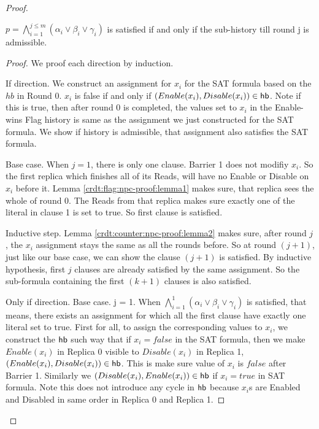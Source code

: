 \begin{proof}
  
  \begin{lemma}
    \label{crdt:flag:npc-proof:lemma3}
    $p = \bigwedge_{i=1}^{j \leq m} (\alpha_i \lor \beta_i \lor \gamma_i)$ is satisfied if and only if the sub-history till round j is admissible.
  \end{lemma}

  \begin{proof}
    We proof each direction by induction.

    If direction.
    We construct an assignment for $x_i$ for the SAT formula based on the $hb$ in Round 0. $x_i$ is false if and only if $(Enable(x_i), Disable(x_i)) \in \textsf{hb}$. Note if this is true, then after round 0 is completed, the values set to $x_i$ in the Enable-wins Flag history is same as the assignment we just constructed for the SAT formula. We show if history is admissible, that assignment also satisfies the SAT formula.

    Base case. When $j = 1$, \ie there is only one clause. Barrier 1 does not modifiy $x_i$. So the first replica which finishes all of its \textrm{Read}s, will have no \textrm{Enable} or \textrm{Disable} on $x_i$ before it. Lemma \ref{crdt:flag:npc-proof:lemma1} makes sure, that replica sees the whole of round 0. The \textrm{Read}s from that replica makes sure exactly one of the literal in clause 1 is set to true. So first clause is satisfied.

    Inductive step. Lemma \ref{crdt:counter:npc-proof:lemma2} makes sure, after round $j$, the $x_i$ assignment stays the same as all the rounds before. So at round $(j+1)$, just like our base case, we can show the clause $(j+1)$ is satisfied. By inductive hypothesis, first $j$ clauses are already satisfied by the same assignment. So the sub-formula containing the first $(k+1)$ clauses is also satisfied.

    Only if direction.
    Base case. j = 1. When $\bigwedge_{i=1}^{1} (\alpha_i \lor \beta_i \lor \gamma_i)$ is satisfied, that means, there exists an assignment for which all the first clause have exactly one literal set to true. First for all, to assign the corresponding values to $x_i$, we construct the $\textsf{hb}$ such way that if $x_i = false$ in the SAT formula, then we make $Enable(x_i)$ in Replica 0 visible to $Disable(x_i)$ in Replica 1, \ie $(Enable(x_i), Disable(x_i)) \in \textsf{hb}$. This is make sure value of $x_i$ is $false$ after Barrier 1. Similarly we $(Disable(x_i), Enable(x_i)) \in \textsf{hb}$ if $x_i = true$ in SAT formula. Note this does not introduce any cycle in $\textsf{hb}$ because $x_i$s are \textrm{Enable}d and \textrm{Disable}d in same order in Replica 0 and Replica 1.


\end{proof}
\end{proof}
